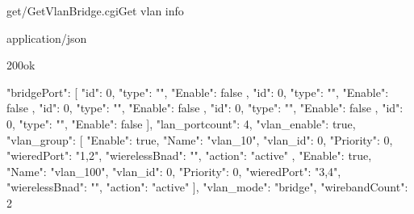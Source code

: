 \documentclass[12pt,a4paper]{article}
\begin{document}
\begin{apiRoute}{get}{/GetVlanBridge.cgi}{Get vlan info}
	
	\begin{routeParameter}
	
	\end{routeParameter}
	\begin{routeResponse}{application/json}
		\begin{routeResponseItem}{200}{ok}
			\begin{routeResponseItemBody}
{
  "bridgePort": [
    {
      "id": 0,
      "type": "",
      "Enable": false
    },
    {
      "id": 0,
      "type": "",
      "Enable": false
    },
    {
      "id": 0,
      "type": "",
      "Enable": false
    },
    {
      "id": 0,
      "type": "",
      "Enable": false
    },
    {
      "id": 0,
      "type": "",
      "Enable": false
    }
  ],
  "lan_portcount": 4,
  "vlan_enable": true,
  "vlan_group": [
    {
      "Enable": true,
      "Name": "vlan_10",
      "vlan_id": 0,
      "Priority": 0,
      "wieredPort": "1,2",
      "wierelessBnad": "",
      "action": "active"
    },
    {
      "Enable": true,
      "Name": "vlan_100",
      "vlan_id": 0,
      "Priority": 0,
      "wieredPort": "3,4",
      "wierelessBnad": "",
      "action": "active"
    }
  ],
  "vlan_mode": "bridge",
  "wirebandCount": 2
}
			\end{routeResponseItemBody}
		\end{routeResponseItem}
	\end{routeResponse}
	
\end{apiRoute}
\end{document}
